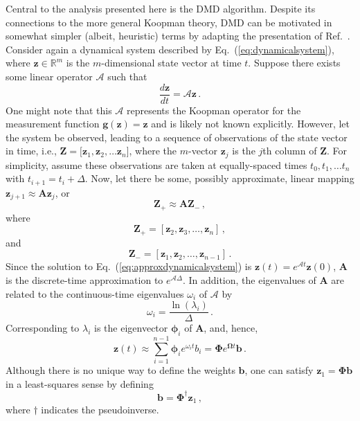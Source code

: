 \documentclass[review,number,sort&compress,12pt]{elsarticle}
\begin{document}
Central to the analysis presented here is the DMD algorithm.
Despite its connections to the more general Koopman theory, DMD can be motivated in somewhat simpler (albeit, heuristic) terms by adapting the presentation of Ref.~\cite{kutzbook}.
Consider again a dynamical system described by Eq.~(\ref{eq:dynamicalsystem}), where $\mathbf{z} \in \mathbb{R}^m$ is the $m$-dimensional state vector at time $t$.
Suppose there exists some linear operator $\mathcal{A}$ such that
\begin{equation}
 \frac{d \mathbf{z}}{dt} = \mathcal{A} \mathbf{z} \, .
 \label{eq:approxdynamicalsystem}
\end{equation}
One might note that this $\mathcal{A}$ represents the Koopman operator for the measurement function $\mathbf{g}(\mathbf{z}) = \mathbf{z}$ and is likely not known explicitly.
However, let the system be observed, leading to a sequence of observations of the state vector in time, i.e., $\mathbf{Z} = [\mathbf{z}_{1}, \mathbf{z}_{2}, \ldots \mathbf{z}_{n}$], where the $m$-vector $\mathbf{z}_{j}$ is the $j$th column of $\mathbf{Z}$. 
For simplicity, assume these observations are taken at equally-spaced times $t_0, t_1, \ldots t_n$ with $t_{i+1} = t_i + \Delta$.  
Now, let there be some, possibly approximate, linear mapping $\mathbf{z}_{j+1} \approx \mathbf{A}\mathbf{z}_{j}$, or \begin{equation}
   \mathbf{Z}_+ \approx \mathbf{A}\mathbf{Z}_- \, ,
   \label{eq:linearmapping}
\end{equation}
where
\begin{equation}
  \mathbf{Z}_+ =  [\mathbf{z}_{2},\mathbf{z}_{3}, \ldots,\mathbf{z}_{n}] \, ,
\end{equation}
and
\begin{equation}
 \mathbf{Z}_- =  [ \mathbf{z}_{1},\mathbf{z}_{2},\ldots, \mathbf{z}_{n-1}] \,  .                                                                                                           
\end{equation}
Since the solution to Eq.~(\ref{eq:approxdynamicalsystem}) is $\mathbf{z}(t) = e^{\mathcal{A}t}\mathbf{z}(0)$, $\mathbf{A}$ is the discrete-time approximation to $e^{\mathcal{A}\Delta}$.
In addition, the  eigenvalues of $\mathbf{A}$ are related to the continuous-time eigenvalues $\omega_i$ of $\mathcal{A}$ by 
\begin{equation}
 \omega_i = \frac{\ln{(\lambda_i)}}{\Delta} \, .
\end{equation}
Corresponding to $\lambda_i$ is the eigenvector $\boldsymbol{\phi}_i$ of $\mathbf{A}$, and, hence,
\begin{equation}
 \mathbf{z}(t) \approx \sum^{n-1}_{i=1} \boldsymbol{\phi}_i e^{\omega_i t} b_i = \boldsymbol{\Phi}e^{\boldsymbol{\Omega}t}\mathbf{b} \, . 
 \label{eq:dmdreconstruction}
\end{equation}
Although there is no unique way to define the weights $\mathbf{b}$, one can satisfy $\mathbf{z}_1 = \boldsymbol{\Phi}\mathbf{b}$  in a least-squares sense by defining
\begin{equation}
 \mathbf{b} = \boldsymbol{\Phi}^{\dagger} \mathbf{z}_1 \, ,
 \label{eq:amplitudes}
\end{equation}
where $\dagger$ indicates the pseudoinverse. 
\end{document}
